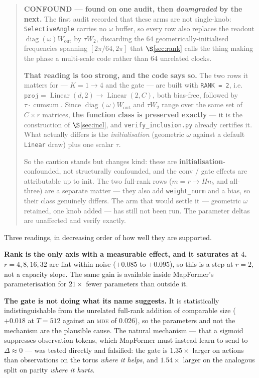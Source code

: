 \documentclass[11pt]{article}
\newcommand{\nb}{n_b}
\begin{document}
\begin{quote}\small
\sloppy\textbf{CONFOUND --- found on one audit, then \emph{downgraded} by the
next.} The first audit recorded that these arms are not single-knob:
\texttt{SelectiveAngle} carries no $\omega$ buffer, so every row also replaces the
readout $\operatorname{diag}(\omega)W_{\mathrm{out}}$ by $\tau W_2$, discarding the
$64$ geometrically-initialised frequencies spanning $[2\pi/64,2\pi]$ that
$\S$\ref{sec:rank} calls the thing making the phase a multi-scale code rather than
$64$ unrelated clocks.

\textbf{That reading is too strong, and the code says so.} The two rows it matters
for --- $K{=}1\to4$ and the gate --- are built with \texttt{RANK\,=\,2}, i.e.\
$\texttt{proj} = \operatorname{Linear}(d,2)\!\to\!\operatorname{Linear}(2,C)$, both
bias-free, followed by $\tau\!\cdot\!\operatorname{cumsum}$. Since
$\operatorname{diag}(\omega)W_{\mathrm{out}}$ and $\tau W_2$ range over the same set
of $C\times r$ matrices, \textbf{the function class is preserved exactly} --- it is
the construction of $\S$\ref{sec:incl}, and \texttt{verify\_inclusion.py} already
certifies it. What actually differs is the \emph{initialisation} (geometric $\omega$
against a default \texttt{Linear} draw) plus one scalar $\tau$.

So the caution stands but changes kind: these are \textbf{initialisation}-confounded,
not structurally confounded, and the conv / gate effects are attributable up to
init. The two full-rank rows ($m=r\to H\nb$ and all-three) are a separate matter --- they
also add \texttt{weight\_norm} and a bias, so their class genuinely differs. The arm
that would settle it --- geometric $\omega$ retained, one knob added --- has still not
been run. The parameter deltas are unaffected and verify exactly.
\end{quote}

\noindent Three readings, in decreasing order of how well they are supported.

\textbf{Rank is the only axis with a measurable effect, and it saturates at $4$.}
$r=4,8,16,32$ are flat within noise ($+0.085$ to $+0.095$), so this is a step at
$r=2$, not a capacity slope. The same gain is available inside MapFormer's
parameterisation for $21\times$ fewer parameters than outside it.

\textbf{The gate is not doing what its name suggests.} It is statistically
indistinguishable from the unrelated full-rank addition of comparable size
($+0.018$ at $T{=}512$ against an \textsc{mde} of $0.026$), so the parameters and
not the mechanism are the plausible cause. The natural mechanism --- that a sigmoid
suppresses observation tokens, which MapFormer must instead learn to send to
$\Delta\approx 0$ --- was tested directly and falsified: the gate is $1.35\times$
larger on actions than observations on the torus \emph{where it helps}, and
$1.54\times$ larger on the analogous split on parity \emph{where it hurts}.
\end{document}
